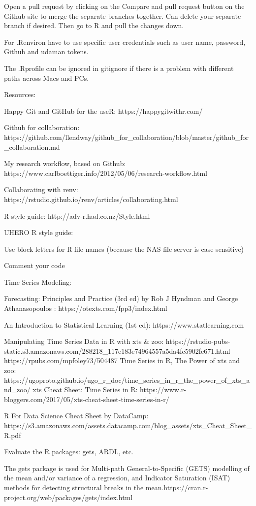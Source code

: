 \documentclass[
  letterpaper,
  DIV=11,
  numbers=noendperiod]{scrreport}
\begin{document}
Open a pull request by clicking on the Compare and pull request button
on the Github site to merge the separate branches together. Can delete
your separate branch if desired. Then go to R and pull the changes down.

For .Renviron have to use specific user credentials such as user name,
password, Github and udaman tokens.

The .Rprofile can be ignored in gitignore if there is a problem with
different paths across Macs and PCs.

Resources:

Happy Git and GitHub for the useR: https://happygitwithr.com/

Github for collaboration:
https://github.com/llendway/github\_for\_collaboration/blob/master/github\_for\_collaboration.md

My research workflow, based on Github:
https://www.carlboettiger.info/2012/05/06/research-workflow.html

Collaborating with renv:
https://rstudio.github.io/renv/articles/collaborating.html

R style guide: http://adv-r.had.co.nz/Style.html

UHERO R style guide:

Use block letters for R file names (because the NAS file server is case
sensitive)

Comment your code

Time Series Modeling:

Forecasting: Principles and Practice (3rd ed) by Rob J Hyndman and
George Athanasopoulos : https://otexts.com/fpp3/index.html

An Introduction to Statistical Learning (1st ed):
https://www.statlearning.com

Manipulating Time Series Data in R with xts \& zoo:
https://rstudio-pubs-static.s3.amazonaws.com/288218\_117e183e74964557a5da4fc5902fc671.html
https://rpubs.com/mpfoley73/504487 Time Series in R, The Power of xts
and zoo:
https://ugoproto.github.io/ugo\_r\_doc/time\_series\_in\_r\_the\_power\_of\_xts\_and\_zoo/
xts Cheat Sheet: Time Series in R:
https://www.r-bloggers.com/2017/05/xts-cheat-sheet-time-series-in-r/

R For Data Science Cheat Sheet by DataCamp:
https://s3.amazonaws.com/assets.datacamp.com/blog\_assets/xts\_Cheat\_Sheet\_R.pdf

Evaluate the R packages: gets, ARDL, etc.

The gets package is used for Multi-path General-to-Specific (GETS)
modelling of the mean and/or variance of a regression, and Indicator
Saturation (ISAT) methods for detecting structural breaks in the
mean.https://cran.r-project.org/web/packages/gets/index.html
\end{document}

